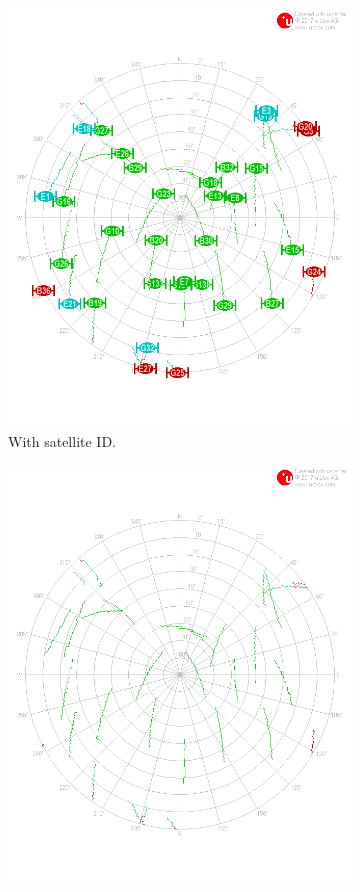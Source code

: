 \documentclass[letterpaper, 10 pt,onecolumn]{article}
\begin{document}
	\begin{figure}[H]
		\centering
		\begin{subfigure}{.5\textwidth}
			\includegraphics[width=0.9\linewidth]{../Moving_DualBand/skyplot.png}
			\caption{	
				With satellite ID.}
			\label{fig:mt2_sky}
		\end{subfigure}%
		\begin{subfigure}{.5\textwidth}
			\includegraphics[width=0.9\linewidth]{../Moving_DualBand/skyplot_orbit.png}

\end{subfigure}
\end{figure}
\end{document}
